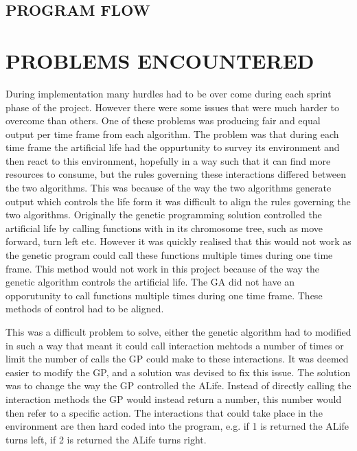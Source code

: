\documentclass[10pt,twocolumn]{article}
\begin{document}
\subsection{PROGRAM FLOW}

\section{PROBLEMS ENCOUNTERED}

During implementation many hurdles had to be over come during each sprint phase of the project. However there were some issues that were much harder to overcome than others. One of these problems was
producing fair and equal output per time frame from each algorithm. The problem was that during each time frame the artificial life had the oppurtunity to survey its environment and then react to this
environment, hopefully in a way such that it can find more resources to consume, but the rules governing these interactions differed between the two algorithms.
This was because of the way the two algorithms generate output which controls the life form it was difficult to align
the rules governing the two algorithms. Originally the genetic programming solution controlled the artificial life by calling functions with in its chromosome tree, such as move forward, turn left etc.
However it was quickly realised that this would not work as the genetic program could call these functions multiple times during one time frame. This method would not work in this project because
of the way the genetic algorithm controls the artificial life. The GA did not have an opporutunity to call functions multiple times during one time frame. These methods of control had to be aligned. 

This was a difficult problem to solve, either the genetic algorithm had to modified in such a way that meant it could call interaction mehtods
a number of times or limit the number of calls the GP could make to these interactions. It was deemed easier to modify the GP, and a solution
was devised to fix this issue. The solution was to change the way the GP controlled the ALife. Instead of directly calling the interaction methods
the GP would instead return a number, this number would then refer to a specific action. The interactions that could take place in 
the environment are then hard coded into the program, e.g. if 1 is returned the ALife turns left, if 2 is returned the ALife turns right.
\end{document}
